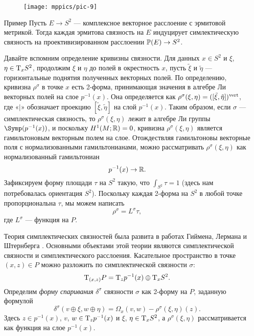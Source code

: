{

\begin{wrapfigure}{o}{40 mm}
\vskip-0mm
\centering
\texttt{[image: mppics/pic-9]}
\caption{}\label{pic-9}
\vskip0mm
\end{wrapfigure}

\begin{ex*}{Пример}
Пусть $E \to S^2$ — комплексное векторное расслоение с эрмитовой метрикой.
Тогда каждая эрмитова связность на $E$ индуцирует симлектическую связность на проективизированном расслоении $\PP(E)\z\to S^2$.
\end{ex*}

Давайте вспомним определение кривизны связности.
Для данных $x\in S^2$ и $\xi$, $\eta \z\in \T_x S^2$, продолжим $\xi$ и $\eta$ до полей в окрестность $x$,
пусть $\tilde\xi$ и $\tilde\eta$ — горизонтальные поднятия
полученных векторных полей. 
По определению, кривизна $\rho^\sigma$ в точке $x$ есть 2-форма,
принимающая значения в алгебре Ли векторных полей на слое
$p^{-1}(x)$. 
Она определяется как $\rho^\sigma (\xi, \eta) \z= ([\tilde\xi,
  \tilde\eta])^\vert$, где «$\vert$» обозначает проекцию $[\tilde\xi,
  \tilde\eta]$  на слой $p^{-1} (x)$. 
Таким образом, если $\sigma$ — симплектическая связность, то
$\rho^\sigma (\xi, \eta)$ лежит в алгебре Ли группы
$\Symp(p^{-1}(x))$, и поскольку $H^1 (M;\mathbb{R}) = 0$, кривизна
$\rho^\sigma (\xi, \eta)$ является гамильтоновым векторным полем на
слое. 
Отождествляя гамильтоновы векторные поля с нормализованными
гамильтонианами, можно рассматривать $\rho^\sigma (\xi, \eta)$ как
нормализованный гамильтониан 
\[p^{-1} (x) \to \mathbb{R}.\]
Зафиксируем форму площади $\tau$ на $S^2$ такую, что $\int_{S^2} \tau
= 1$ (здесь нам потребовалась ориентация $S^2$). 
Поскольку каждая 2-форма на $S^2$ в любой точке
пропорциональна $\tau$, мы можем написать
\[\rho^\sigma = L^\sigma \tau,\]
где $L^\sigma$ — функция на $P$.

}

Теория симплектических связностей была развита в работах
Гиймена,
Лермана
и Штернберга \cite{GLS,MS}. 
Основными объектами этой теории являются  симплектической связности и  симплектического расслоения. 
Касательное пространство в точке $(x, z) \in P$ можно разложить по симплектической
связности $\sigma$: 
\[\mathrm{T}_{(x,z)} P = \mathrm{T}_z p^{-1} (x) \oplus \mathrm{T}_x S^2.\]
Определим \emph{форму спаривания} $\delta^\sigma$ связности $\sigma$
как 2-форму на $P$, заданную формулой  
\[\delta^\sigma (v \oplus \xi, w \oplus \eta) = \Omega_x (v, w) -
\rho^\sigma (\xi, \eta)(z).\] 
Здесь $z \in p^{-1} (x)$, $v$, $w \in \mathrm{T}_z p^{-1} (x)$ и $\xi$, $\eta
\in \mathrm{T}_x S^2$, а $\rho^\sigma (\xi, \eta)$ рассматривается как функция
на слое $p^{-1} (x)$. 

